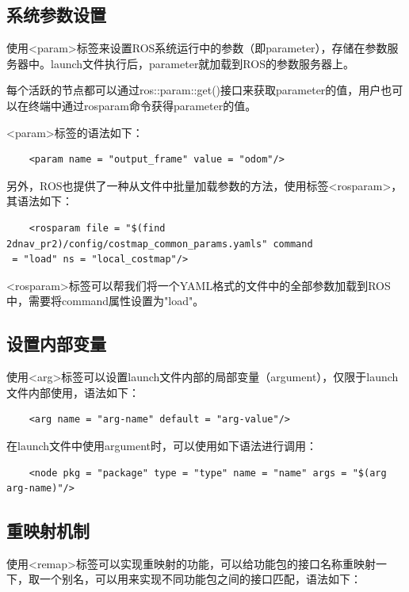 \documentclass[9pt, oneside]{book}
\begin{document}
\subsection{系统参数设置}

使用<param>标签来设置ROS系统运行中的参数（即parameter），存储在参数服务器中。launch文件执行后，parameter就加载到ROS的参数服务器上。

每个活跃的节点都可以通过ros::param::get()接口来获取parameter的值，用户也可以在终端中通过rosparam命令获得parameter的值。

<param>标签的语法如下：

\begin{verbatim}
    <param name = "output_frame" value = "odom"/>
\end{verbatim}

另外，ROS也提供了一种从文件中批量加载参数的方法，使用标签<rosparam>，其语法如下：

\begin{verbatim}
    <rosparam file = "$(find 2dnav_pr2)/config/costmap_common_params.yamls" command
 = "load" ns = "local_costmap"/>
\end{verbatim}

<rosparam>标签可以帮我们将一个YAML格式的文件中的全部参数加载到ROS中，需要将command属性设置为"load"。

\subsection{设置内部变量}

使用<arg>标签可以设置launch文件内部的局部变量（argument），仅限于launch文件内部使用，语法如下：

\begin{verbatim}
    <arg name = "arg-name" default = "arg-value"/>
\end{verbatim}

在launch文件中使用argument时，可以使用如下语法进行调用：

\begin{verbatim}
    <node pkg = "package" type = "type" name = "name" args = "$(arg arg-name)"/>
\end{verbatim}

\subsection{重映射机制}

使用<remap>标签可以实现重映射的功能，可以给功能包的接口名称重映射一下，取一个别名，可以用来实现不同功能包之间的接口匹配，语法如下：
\end{document}

